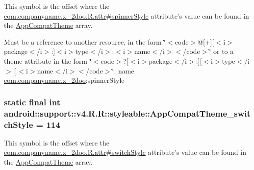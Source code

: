 This symbol is the offset where the \hyperlink{classcom_1_1companyname_1_1x__2doo_1_1_r_1_1attr_a9aed97714f8f40785c265abfe64e770}{com.companyname.x\_\-2doo.R.attr\#spinnerStyle} attribute's value can be found in the \hyperlink{classandroid_1_1support_1_1v4_1_1_r_1_1styleable_0873e92ba21076bb5a4aeadeb7f5779f}{AppCompatTheme} array.

Must be a reference to another resource, in the form \char`\"{}$<$code$>$@\mbox{[}+\mbox{]}\mbox{[}$<$i$>$package$<$/i$>$:\mbox{]}$<$i$>$type$<$/i$>$:$<$i$>$name$<$/i$>$$<$/code$>$\char`\"{} or to a theme attribute in the form \char`\"{}$<$code$>$?\mbox{[}$<$i$>$package$<$/i$>$:\mbox{]}\mbox{[}$<$i$>$type$<$/i$>$:\mbox{]}$<$i$>$name$<$/i$>$$<$/code$>$\char`\"{}.  name \hyperlink{namespacecom_1_1companyname_1_1x__2doo}{com.companyname.x\_\-2doo}:spinnerStyle \hypertarget{classandroid_1_1support_1_1v4_1_1_r_1_1styleable_b500f751fdb168654edc56fa5b3f9455}{
\subsubsection[{AppCompatTheme\_\-switchStyle}]{\setlength{\rightskip}{0pt plus 5cm}static final int android::support::v4.R.R::styleable::AppCompatTheme\_\-switchStyle = 114}}
\label{classandroid_1_1support_1_1v4_1_1_r_1_1styleable_b500f751fdb168654edc56fa5b3f9455}


This symbol is the offset where the \hyperlink{classcom_1_1companyname_1_1x__2doo_1_1_r_1_1attr_fd77d462534cbec9082a7f764fb19f69}{com.companyname.x\_\-2doo.R.attr\#switchStyle} attribute's value can be found in the \hyperlink{classandroid_1_1support_1_1v4_1_1_r_1_1styleable_0873e92ba21076bb5a4aeadeb7f5779f}{AppCompatTheme} array.

